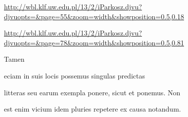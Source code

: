 
\newParkoszpage

{
\url{http://wbl.klf.uw.edu.pl/13/2/iParkosz.djvu?djvuopts=&page=55&zoom=width&showposition=0.5,0.18}

\url{http://wbl.klf.uw.edu.pl/13/2/iParkosz.djvu?djvuopts=&page=78&zoom=width&showposition=0.5,0.81}
}

\bigskip

\obeylines
\mono



\fullpreviouslines


{
\color{blue}

Tamen 

eciam in suis locis possemus singulas predictas 
}


\fulllines

litteras seu earum exempla ponere, sicut et ponemus. Non

est enim vicium idem pluries repetere ex causa notandum.



\def\splitverse{\advance\plineno by 1\psublineno=0\everypar{\advance\psublineno by 1\llap{\textcolor{green}{\the\ppageno-\ifnum\plineno<10 0\fi\the \plineno-\the\psublineno \ }}\hskip5em}}

\def\fullverselines{\everypar{\advance\plineno by 1\llap{\the\ppageno-\ifnum\plineno<10 0\fi\the \plineno \hskip 1.5em}\hskip5em}}


\def\newverse{\advance\plineno by 1\psublineno=0\hskip10em}
\def\newversesubline{\hskip10em}
\def\newverseline{\advance\plineno by 1\psublineno=0}
\def\indentVerse{\hskip10em}


